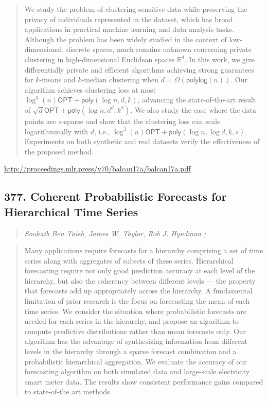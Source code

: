\documentclass{article}
\begin{document}
\begin{quote}
    We study the problem of clustering sensitive data while preserving the privacy of individuals represented in the dataset, which has broad applications in practical machine learning and data analysis tasks. Although the problem has been widely studied in the context of low-dimensional, discrete spaces, much remains unknown concerning private clustering in high-dimensional Euclidean spaces $\mathbb{R}^d$. In this work, we give differentially private and efficient algorithms achieving strong guarantees for $k$-means and $k$-median clustering when $d=\Omega(\mathsf{polylog}(n))$. Our algorithm achieves clustering loss at most $\log^3(n)\mathsf{OPT}+\mathsf{poly}(\log n,d,k)$, advancing the state-of-the-art result of $\sqrt{d}\mathsf{OPT}+\mathsf{poly}(\log n,d^d,k^d)$. We also study the case where the data points are $s$-sparse and show that the clustering loss can scale logarithmically with $d$, i.e., $\log^3(n)\mathsf{OPT}+\mathsf{poly}(\log n,\log d,k,s)$. Experiments on both synthetic and real datasets verify the effectiveness of the proposed method.  
\end{quote}

\href{http://proceedings.mlr.press/v70/balcan17a/balcan17a.pdf}{http://proceedings.mlr.press/v70/balcan17a/balcan17a.pdf}

\subsection{377. Coherent Probabilistic Forecasts for Hierarchical Time Series}

\begin{quote}
\footnotesize{\textit{Souhaib Ben Taieb, James W. Taylor, Rob J. Hyndman ;}}

\end{quote}

\begin{quote}
    Many applications require forecasts for a hierarchy comprising a set of time series along with aggregates of subsets of these series. Hierarchical forecasting require not only good prediction accuracy at each level of the hierarchy, but also the coherency between different levels — the property that forecasts add up appropriately across the hierarchy. A fundamental limitation of prior research is the focus on forecasting the mean of each time series. We consider the situation where probabilistic forecasts are needed for each series in the hierarchy, and propose an algorithm to compute predictive distributions rather than mean forecasts only. Our algorithm has the advantage of synthesizing information from different levels in the hierarchy through a sparse forecast combination and a probabilistic hierarchical aggregation. We evaluate the accuracy of our forecasting algorithm on both simulated data and large-scale electricity smart meter data. The results show consistent performance gains compared to state-of-the art methods.  
\end{quote}
\end{document}
